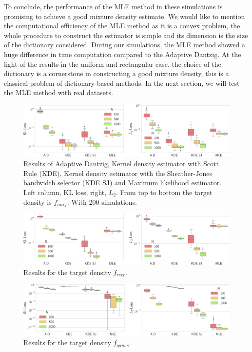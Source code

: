 To conclude, the performance of the MLE method in these simulations is promising to achieve a good mixture density estimate. We would like to mention the computational efficiency of the MLE method as it is a convex problem, the whole procedure to construct the estimator is simple and its dimension is the size of the dictionary considered. During our simulations, the MLE method showed a huge difference in time computation compared to the Adaptive Dantzig. At the light of the results in the uniform and rectangular case, the choice of the dictionary is a cornerstone in constructing a good mixture density, this is a classical problem of dictionary-based methods. In the next section, we will test the MLE method with real datasets.

\begin{figure}
    \includegraphics[width=\textwidth]{./TeX_files/full_results_uniform.png}
    \caption{Results of Adaptive Dantzig, Kernel density estimator with Scott Rule (KDE), Kernel density estimator with the Sheather-Jones bandwidth selector (KDE SJ) and Maximum likelihood estimator. Left column, KL loss, right, $L_2$. From top to bottom the target density is $f_{unif}$. With 200 simulations.}
    \label{fig:res_uniform_weight_estim}
\end{figure}

\begin{figure}
    \includegraphics[width=\textwidth]{./TeX_files/full_results_rect.png}
    \caption{Results for the target density $f_{rect}$.}
    \label{fig:res_rect_weight_estim}
\end{figure}

\begin{figure}
    \includegraphics[width=\textwidth]{./TeX_files/full_results_gauss.png}
    \caption{Results for the target density $f_{gauss}$.}
    \label{fig:res_gauss_weight_estim}
\end{figure}

